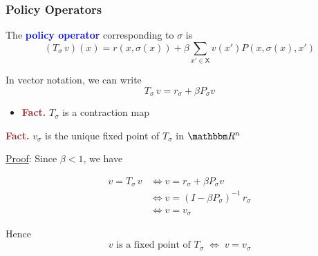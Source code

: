 \documentclass[xcolor=dvipsnames]{beamer}
\newcommand{\navy}[1]{\textcolor{Blue}{\bf #1}}
\newcommand{\Fact}{\textcolor{Brown}{\bf Fact. }}
\newcommand{\RR}{\mathbbm R}
\newcommand{\Xsf}{\mathsf X}
\newcommand{\1}{\mathbbm 1}
\begin{document}
\begin{frame}
    \frametitle{Policy Operators}

   The \navy{policy operator} corresponding to $\sigma$ is
    \begin{equation*}
        (T_\sigma \, v)(x)
        =
            r(x, \sigma(x))
            + \beta
            \sum_{x' \in \Xsf} v(x') P(x, \sigma(x), x')
    \end{equation*}



    \vspace{0.5em}
    In vector notation, we can write
    \begin{equation*}
        T_\sigma \, v 
        = r_\sigma + \beta P_\sigma v
    \end{equation*}

    \vspace{0.5em}
    \vspace{0.5em}

    \begin{itemize}
        \item \Fact $T_\sigma$ is a contraction map
    \end{itemize}

\end{frame}



\begin{frame}
    
    \Fact $v_\sigma$ is the unique fixed
    point of $T_\sigma$ in $\RR^n$ 

    \pause
    \vspace{0.5em}
    \vspace{0.5em}
    \underline{Proof}: Since $\beta < 1$, we have

    \begin{align*}
        v = T_\sigma \, v
        & \iff v = r_\sigma + \beta P_\sigma v
        \\
        & \iff v = (I - \beta P_\sigma)^{-1} \, r_\sigma 
        \\
        & \iff v = v_\sigma
    \end{align*}

    \vspace{0.5em}
    Hence 
    $$v \text{ is a fixed point of } T_\sigma \; \iff \; v = v_\sigma $$

\end{frame}
\end{document}
